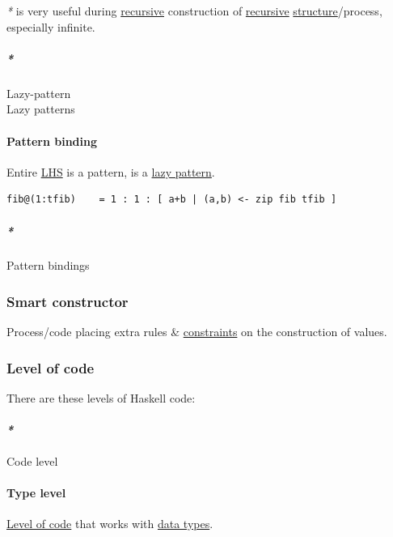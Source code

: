\documentclass[11pt]{article}
\begin{document}
\emph{*} is very useful during \hyperref[orgf513e66]{recursive} construction of \hyperref[orgf513e66]{recursive} \hyperref[org8051f61]{structure}/process, especially infinite.\\

\subparagraph{\emph{*}}
\label{sec:orgcdcf95f}

\label{org5636c7e}Lazy-pattern\\
\label{org1bca3b4}Lazy patterns\\

\paragraph{\label{org83e83c5}Pattern binding}
\label{sec:org4dde48c}
Entire \hyperref[orgf575de7]{LHS} is a pattern, is a \hyperref[org618e055]{lazy pattern}.\\

\begin{verbatim}
fib@(1:tfib)    = 1 : 1 : [ a+b | (a,b) <- zip fib tfib ]
\end{verbatim}

\subparagraph{\emph{*}}
\label{sec:org4293b48}

\label{org4f6bef6}Pattern bindings\\

\subsubsection{\label{orge052aeb}Smart constructor}
\label{sec:orgc601ff4}
Process/code placing extra rules \& \hyperref[orgcddf7a9]{constraints} on the construction of values.\\

\subsubsection{\label{org6ffbfd4}Level of code}
\label{sec:org83074ae}
There are these levels of Haskell code:\\

\paragraph{\emph{*}}
\label{sec:org1651185}

\label{orga4928d1}Code level\\

\paragraph{\label{orgfe4cf3f}Type level}
\label{sec:orgac4ace5}
\hyperref[org6ffbfd4]{Level of code} that works with \hyperref[org5c444ae]{data types}.\\
\end{document}
